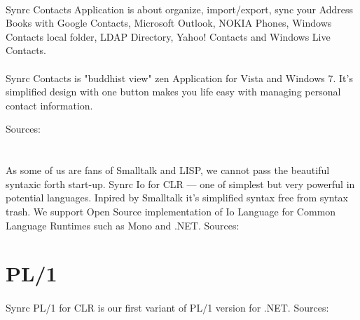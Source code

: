 \documentclass[11pt]{article}
\begin{document}
\paragraph{}
Synrc Contacts Application is about organize,
import/export, sync your Address Books with Google Contacts,
Microsoft Outlook, NOKIA Phones, Windows Contacts local folder,
LDAP Directory, Yahoo! Contacts and Windows Live Contacts.
\paragraph{}
Synrc Contacts is "buddhist view" zen Application for
Vista and Windows 7. It's simplified design with one button
makes you life easy with managing personal contact information.

Sources: 


\section*{}

\paragraph{}
As some of us are fans of Smalltalk and LISP, we cannot pass the
beautiful syntaxic forth start-up. Synrc Io for CLR --- one of simplest but very
powerful in potential languages. Inpired by Smalltalk it's simplified
syntax free from syntax trash. We support Open Source implementation
of Io Language for Common Language Runtimes such as Mono and .NET.
Sources: 

\section*{PL/1}
\paragraph{}
Synrc PL/1 for CLR is our first variant of PL/1 version for .NET.
Sources: 
\end{document}
